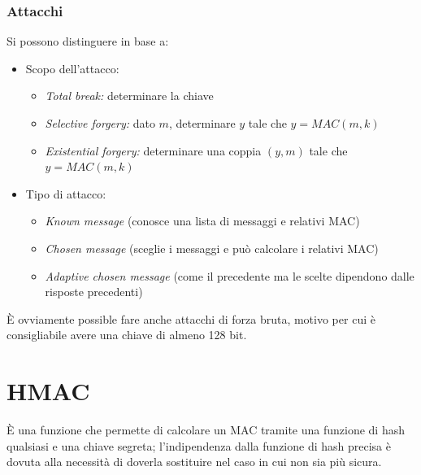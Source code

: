 \subsubsection{Attacchi}

Si possono distinguere in base a:
\begin{itemize}
    \item Scopo dell'attacco:
    \begin{itemize}
        \item \textit{Total break:} determinare la chiave 
        \item \textit{Selective forgery:} dato $m$, determinare $y$ tale che $y=MAC(m, k)$
        \item \textit{Existential forgery:} determinare una coppia $(y,m)$ tale che $y=MAC(m, k)$
    \end{itemize}
    \item Tipo di attacco:
    \begin{itemize}
        \item \textit{Known message} (conosce una lista di messaggi e relativi MAC)
        \item \textit{Chosen message} (sceglie i messaggi e può calcolare i relativi MAC)
        \item \textit{Adaptive chosen message} (come il precedente ma le scelte dipendono dalle risposte precedenti)
    \end{itemize}
\end{itemize}

\noindent È ovviamente possible fare anche attacchi di forza bruta, motivo per cui è consigliabile 
avere una chiave di almeno 128 bit.

\newpage
\section{HMAC}

È una funzione che permette di calcolare un MAC tramite una funzione di hash qualsiasi e una 
chiave segreta; l'indipendenza dalla funzione di hash precisa è dovuta alla necessità di 
doverla sostituire nel caso in cui non sia più sicura.

